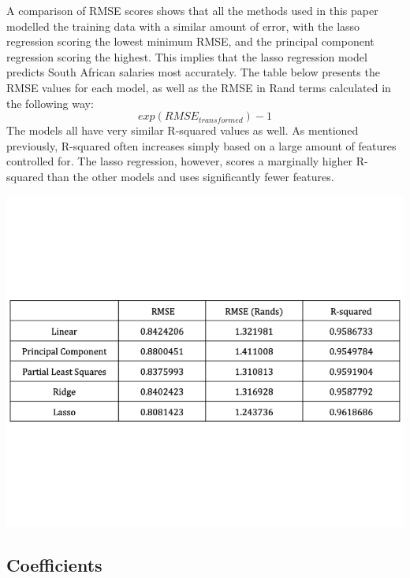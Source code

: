 \documentclass[11pt,preprint, authoryear]{elsarticle}
\numberwithin{equation}{section}
\numberwithin{figure}{section}
\numberwithin{table}{section}
\begin{document}
A comparison of RMSE scores shows that all the methods used in this
paper modelled the training data with a similar amount of error, with
the lasso regression scoring the lowest minimum RMSE, and the principal
component regression scoring the highest. This implies that the lasso
regression model predicts South African salaries most accurately. The
table below presents the RMSE values for each model, as well as the RMSE
in Rand terms calculated in the following way:
\[ exp(RMSE_{transformed})-1\] The models all have very similar
R-squared values as well. As mentioned previously, R-squared often
increases simply based on a large amount of features controlled for. The
lasso regression, however, scores a marginally higher R-squared than the
other models and uses significantly fewer features.

\begin{center}\includegraphics{MLPDF_files/figure-latex/unnamed-chunk-14-1} \end{center}

\hypertarget{coefficients}{%
\subsection{Coefficients}\label{coefficients}}
\end{document}
